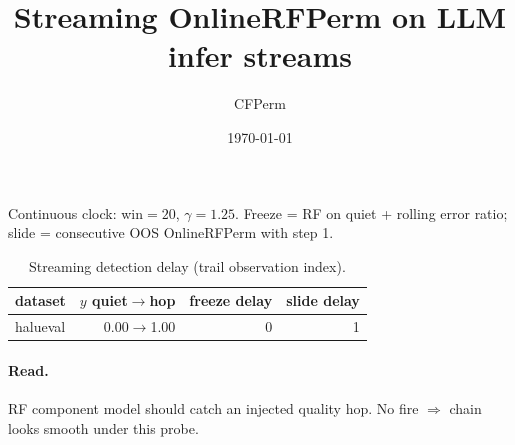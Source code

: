 \documentclass[11pt]{article}
\title{Streaming OnlineRFPerm on LLM infer streams}
\author{CFPerm}
\date{\today}
\begin{document}
\maketitle
Continuous clock: win$=20$, $\gamma=1.25$. Freeze = RF on quiet + rolling error ratio; slide = consecutive OOS OnlineRFPerm with step 1.
\begin{table}[h]\centering
\caption{Streaming detection delay (trail observation index).}
\begin{tabular}{lrrr}
\toprule dataset & $y$ quiet$\to$hop & freeze delay & slide delay \\
\midrule
halueval & 0.00$\to$1.00 & 0 & 1 \\
\bottomrule\end{tabular}\end{table}
\paragraph{Read.}
RF component model should catch an injected quality hop. No fire $\Rightarrow$ chain looks smooth under this probe.
\end{document}
